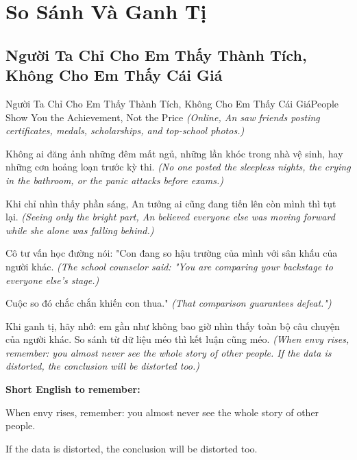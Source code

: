 \chapter{So Sánh Và Ganh Tị}

\section{Người Ta Chỉ Cho Em Thấy Thành Tích, Không Cho Em Thấy Cái Giá}
\begin{truyen}{Người Ta Chỉ Cho Em Thấy Thành Tích, Không Cho Em Thấy Cái Giá}{People Show You the Achievement, Not the Price}
\textit{(Online, An saw friends posting certificates, medals, scholarships, and top-school photos.)}

Không ai đăng ảnh những đêm mất ngủ, những lần khóc trong nhà vệ sinh, hay những cơn hoảng loạn trước kỳ thi.
\textit{(No one posted the sleepless nights, the crying in the bathroom, or the panic attacks before exams.)}

Khi chỉ nhìn thấy phần sáng, An tưởng ai cũng đang tiến lên còn mình thì tụt lại.
\textit{(Seeing only the bright part, An believed everyone else was moving forward while she alone was falling behind.)}

Cô tư vấn học đường nói: "Con đang so hậu trường của mình với sân khấu của người khác.
\textit{(The school counselor said: "You are comparing your backstage to everyone else’s stage.)}

Cuộc so đó chắc chắn khiến con thua."
\textit{(That comparison guarantees defeat.")}

\end{truyen}

\begin{baihoc}
Khi ganh tị, hãy nhớ: em gần như không bao giờ nhìn thấy toàn bộ câu chuyện của người khác. So sánh từ dữ liệu méo thì kết luận cũng méo.
\textit{(When envy rises, remember: you almost never see the whole story of other people. If the data is distorted, the conclusion will be distorted too.)}
\end{baihoc}

\begin{ghinhoanh}
\textbf{Short English to remember:}

When envy rises, remember: you almost never see the whole story of other people.

If the data is distorted, the conclusion will be distorted too.

\end{ghinhoanh}

